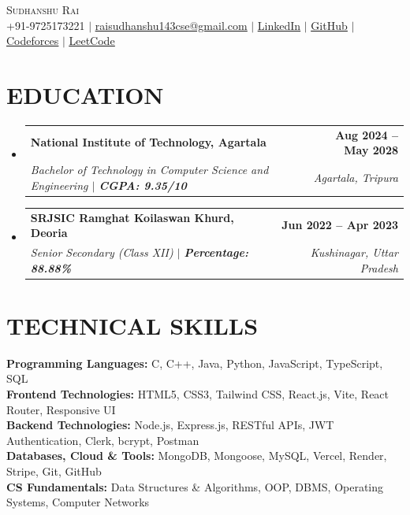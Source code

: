 \documentclass[letterpaper,11pt]{article}
\makeatletter
\newcommand{\resumeSubheading}[4]{
  \vspace{-2pt}\item
    \begin{tabular*}{1.0\textwidth}[t]{l@{\extracolsep{\fill}}r}
      \textbf{\large#1} & \textbf{\small #2} \\
      \textit{\small#3} & \textit{\small #4} \\
    \end{tabular*}\vspace{-7pt}
}
\newcommand{\resumeSubHeadingListStart}{\begin{itemize}[leftmargin=0.0in, label={}]}
\newcommand{\resumeSubHeadingListEnd}{\end{itemize}}
\makeatother
\begin{document}
\begin{center}
    {\Huge \scshape Sudhanshu Rai} \\ \vspace{2pt}
    \small +91-9725173221 $|$
    \href{mailto:raisudhanshu143cse@gmail.com}{\underline{raisudhanshu143cse@gmail.com}} $|$
    \href{https://linkedin.com/in/sudhanshu-rai2005}{\underline{LinkedIn}} $|$
    \href{https://github.com/sudhanshurai2004}{\underline{GitHub}} $|$
    \href{https://codeforces.com/profile/sudhanshurai2005}{\underline{Codeforces}} $|$
    \href{https://leetcode.com/u/sudhanshurai2005}{\underline{LeetCode}}
\end{center}
\vspace{-18pt}

\section{EDUCATION}
\resumeSubHeadingListStart
    \resumeSubheading
      {National Institute of Technology, Agartala}{Aug 2024 -- May 2028}
      {Bachelor of Technology in Computer Science and Engineering $|$ \textbf{CGPA: 9.35/10}}{Agartala, Tripura}
    \resumeSubheading
      {SRJSIC Ramghat Koilaswan Khurd, Deoria}{Jun 2022 -- Apr 2023}
      {Senior Secondary (Class XII) $|$ \textbf{Percentage: 88.88\%}}{Kushinagar, Uttar Pradesh}
\resumeSubHeadingListEnd
\vspace{-14pt}

\section{TECHNICAL SKILLS}
\begin{itemize}[leftmargin=0.15in, label={}]
    \small{\item{
     \textbf{Programming Languages:}{ C, C++, Java, Python, JavaScript, TypeScript, SQL} \\
     \textbf{Frontend Technologies:}{ HTML5, CSS3, Tailwind CSS, React.js, Vite, React Router, Responsive UI} \\
     \textbf{Backend Technologies:}{ Node.js, Express.js, RESTful APIs, JWT Authentication, Clerk, bcrypt, Postman} \\
     \textbf{Databases, Cloud \& Tools:}{ MongoDB, Mongoose, MySQL, Vercel, Render, Stripe, Git, GitHub} \\
     \textbf{CS Fundamentals:}{ Data Structures \& Algorithms, OOP, DBMS, Operating Systems, Computer Networks}
    }}
\end{itemize}
\vspace{-16pt}
\end{document}
